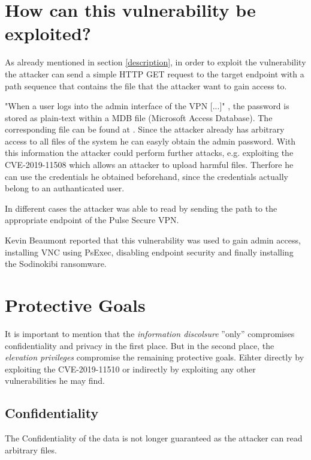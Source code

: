 \section{How can this vulnerability be exploited?}
\label{sec:exploitation}
As already mentioned in section \ref{description}, in order to exploit the vulnerability the attacker can send a simple HTTP GET request to the target endpoint with a path sequence that contains the file that the attacker want to gain access to. \autocite{Tenable2:online}

"When a user logs into the admin interface of the VPN [...]" \autocite{Tenable2:online}, the password is stored as plain-text within a MDB file (Microsoft Access Database). The corresponding file can be found at . Since the attacker already has arbitrary access to all files of the system he can easyly obtain the admin password. With this information the attacker could perform further attacks, e.g. exploiting the CVE-2019-11508 which allows an attacker to upload harmful files. Therfore he can use the credentials he obtained beforehand, since the credentials actually belong to an authanticated user. \autocite{Tenable2:online}

In different cases the attacker was able to read  by sending the path  to the appropriate endpoint of the Pulse Secure VPN. \autocite{ExploitExample:online}

Kevin Beaumont reported that this vulnerability was used to gain admin access, installing VNC using PsExec, disabling endpoint security and finally installing the Sodinokibi ransomware.\autocite{Tenable1:online}

\section{Protective Goals}
\label{protective-goals}
It is important to mention that the \textit{information discolsure} ''only'' compromises confidentiality and privacy in the first place. But in the second place, the \textit{elevation privileges} compromise the remaining protective goals. Eihter directly by exploiting the CVE-2019-11510 or indirectly by exploiting any other vulnerabilities he may find.

\subsection{Confidentiality}
The Confidentiality of the data is not longer guaranteed as the attacker can read arbitrary files.

